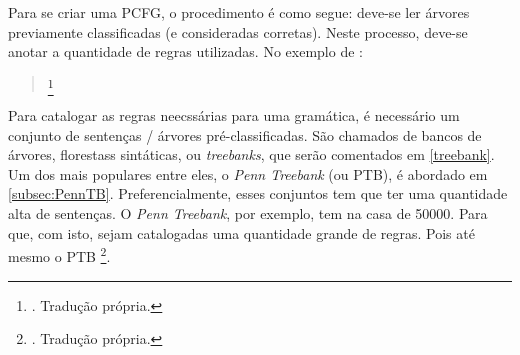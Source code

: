 Para se criar uma PCFG, o procedimento é como segue: deve-se ler árvores previamente classificadas (e consideradas corretas). Neste processo, deve-se anotar a quantidade de regras utilizadas. No exemplo de :
\begin{quote}
    \footnote{. Tradução própria.}
\end{quote}
Para catalogar as regras neecssárias para uma gramática, é necessário um conjunto de sentenças / árvores pré-classificadas. São chamados de bancos de árvores, florestass sintáticas, ou \textit{treebanks}, que serão comentados em \ref{treebank}. Um dos mais populares entre eles, o \textit{Penn Treebank} (ou PTB), é abordado em \ref{subsec:PennTB}. Preferencialmente, esses conjuntos tem que ter uma quantidade alta de sentenças. O  \textit{Penn Treebank}, por exemplo, tem na casa de 50000. Para que, com isto, sejam catalogadas uma quantidade grande de regras. Pois até mesmo o PTB  \footnote{. Tradução própria.}.

